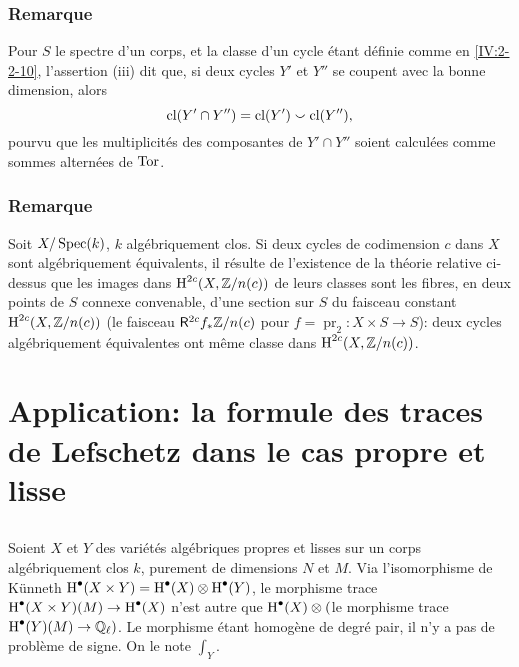 \subsubsection{Remarque}\label{IV:2-3-9}

Pour $S$ le spectre d'un corps, et la classe d'un cycle \'etant d\'efinie comme 
en \ref{IV:2-2-10}, l'assertion (iii) dit que, si deux cycles $Y'$ et $Y''$ se 
coupent avec la bonne dimension, alors 
\[
  \operatorname{cl}(Y'\cap Y'') = \operatorname{cl}(Y')\smallsmile \operatorname{cl}(Y'')\text{,}
\]
pourvu que les multiplicit\'es des composantes de $Y'\cap Y''$ soient 
calcul\'ees comme sommes altern\'ees de $\operatorname{Tor}$. 





\subsubsection{Remarque}\label{IV:2-3-10}

Soit $X/\operatorname{Spec}(k)$, $k$ alg\'ebriquement clos. Si deux cycles de codimension $c$ 
dans $X$ sont alg\'ebriquement \'equivalents, il r\'esulte de l'existence de la 
th\'eorie relative ci-dessus que les images dans $\operatorname{H}^{2 c}(X,\mathbb{Z}/n(c))$ de 
leurs classes sont les fibres, en deux points de $S$ connexe convenable, d'une 
section sur $S$ du faisceau constant $\operatorname{H}^{2 c}(X,\mathbb{Z}/n(c))$ (le faisceau 
$\mathsf{R}^{2 c} f_\ast \mathbb{Z}/n(c)$ pour $f=\operatorname{pr}_2:X\times S\to S$): deux 
cycles alg\'ebriquement \'equivalentes ont m\^eme classe dans 
$\operatorname{H}^{2 c}(X,\mathbb{Z}/n(c))$. 




















\section{Application: la formule des traces de Lefschetz dans le cas propre et lisse}\label{IV:3}





\subsection{}\label{IV:3-1}

Soient $X$ et $Y$ des vari\'et\'es alg\'ebriques propres et lisses sur un corps 
alg\'ebriquement clos $k$, purement de dimensions $N$ et $M$. Via 
l'isomorphisme de K\"unneth 
$\operatorname{H}^\bullet(X\times Y)=\operatorname{H}^\bullet(X)\otimes \operatorname{H}^\bullet(Y)$, le morphisme trace 
$\operatorname{H}^\bullet(X\times Y)(M)\to \operatorname{H}^\bullet(X)$ n'est autre que 
$\operatorname{H}^\bullet(X)\otimes ($le morphisme trace $\operatorname{H}^\bullet(Y)(M)\to \mathbb{Q}_\ell)$. Le 
morphisme \'etant homog\`ene de degr\'e pair, il n'y a pas de probl\`eme de 
signe. On le note $\int_Y$. 





